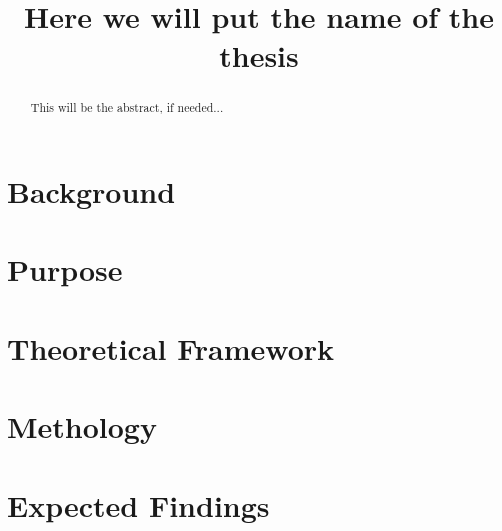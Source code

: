 \documentclass{IEEEtran}
\title{Here we will put the name of the thesis}
\begin{document}
\author{
}
\maketitle

\begin{abstract}
    This will be the abstract, if needed...
\end{abstract}

\tableofcontents

\section{Background}
\section{Purpose}
\section{Theoretical Framework}
\section{Methology}
\section{Expected Findings}

\printbibliography
\end{document}
